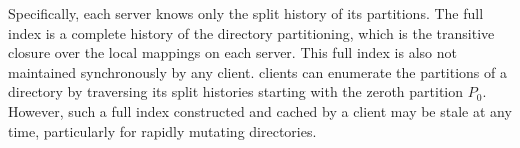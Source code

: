 Specifically, each server knows only the split history of its partitions.
The full \giga{} index is a complete history of the directory partitioning, 
which is the transitive closure over the local mappings on each server.
This full index is also not maintained synchronously by any client.
\giga{} clients can enumerate the partitions of a directory by traversing 
its split histories starting with the zeroth partition $P_0$.
However, such a full index constructed and cached by a client may be stale at
any time, particularly for rapidly mutating directories.



